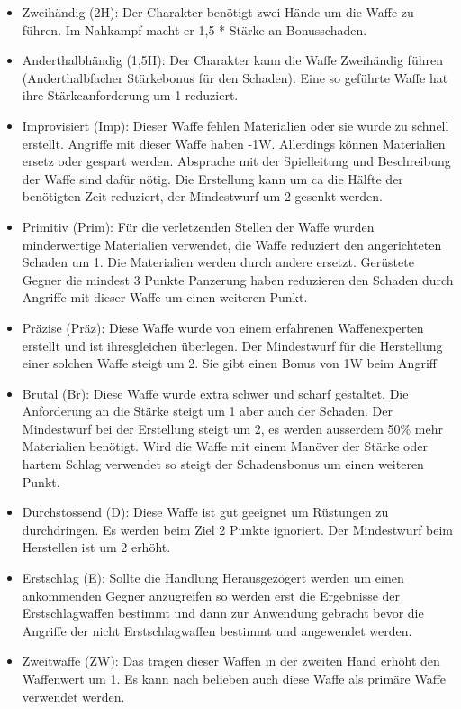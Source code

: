 \documentclass{article}
\begin{document}
\begin{itemize}
\item Zweihändig (2H): Der Charakter benötigt zwei Hände um die Waffe zu führen. Im Nahkampf macht er 1,5 * Stärke an Bonusschaden.
\item Anderthalbhändig (1,5H): Der Charakter kann die Waffe Zweihändig führen (Anderthalbfacher Stärkebonus für den Schaden). Eine so geführte Waffe hat ihre Stärkeanforderung um 1 reduziert.
\item Improvisiert (Imp): Dieser Waffe fehlen Materialien oder sie wurde zu schnell erstellt. Angriffe mit dieser Waffe haben -1W. Allerdings können Materialien ersetz oder gespart werden. Absprache mit der Spielleitung und Beschreibung der Waffe sind dafür nötig. Die Erstellung kann um ca die Hälfte der benötigten Zeit reduziert, der Mindestwurf um 2 gesenkt werden.
\item Primitiv (Prim): Für die verletzenden Stellen der Waffe wurden minderwertige Materialien verwendet, die Waffe reduziert den angerichteten Schaden um 1. Die Materialien werden durch andere ersetzt. Gerüstete Gegner die mindest 3 Punkte Panzerung haben reduzieren den Schaden durch Angriffe mit dieser Waffe um einen weiteren Punkt.
\item Präzise (Präz): Diese Waffe wurde von einem erfahrenen Waffenexperten erstellt und ist ihresgleichen überlegen. Der Mindestwurf für die Herstellung einer solchen Waffe steigt um 2. Sie gibt einen Bonus von 1W beim Angriff
\item Brutal (Br): Diese Waffe wurde extra schwer und scharf gestaltet. Die Anforderung an die Stärke steigt um 1 aber auch der Schaden. Der Mindestwurf bei der Erstellung steigt um 2, es werden ausserdem 50\% mehr Materialien benötigt. Wird die Waffe mit einem Manöver der Stärke oder hartem Schlag verwendet so steigt der Schadensbonus um einen weiteren Punkt.
\item Durchstossend (D): Diese Waffe ist gut geeignet um Rüstungen zu durchdringen. Es werden beim Ziel 2 Punkte ignoriert. Der Mindestwurf beim Herstellen ist um 2 erhöht.
\item Erstschlag (E): Sollte die Handlung Herausgezögert werden um einen ankommenden Gegner anzugreifen so werden erst die Ergebnisse der Erstschlagwaffen bestimmt und dann zur Anwendung gebracht bevor die Angriffe der nicht Erstschlagwaffen bestimmt und angewendet werden.
\item Zweitwaffe (ZW): Das tragen dieser Waffen in der zweiten Hand erhöht den Waffenwert um 1. Es kann nach belieben auch diese Waffe als primäre Waffe verwendet werden.

\end{itemize}
\end{document}
